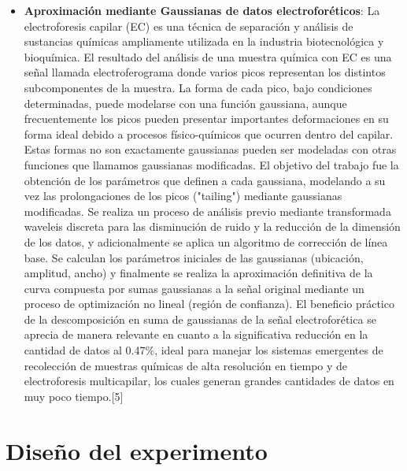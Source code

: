 \documentclass[12pt,a4paper]{article}
\begin{document}
\begin{multicols}{2}
\begin{itemize}
        \item \textbf{Aproximación mediante Gaussianas  de datos electroforéticos}: La electroforesis capilar (EC) es una técnica de separación y análisis de sustancias químicas ampliamente utilizada en la industria biotecnológica y bioquímica. El resultado del análisis de una muestra química con EC es una señal llamada electroferograma donde varios picos  representan los distintos subcomponentes de la muestra. La forma de cada pico, bajo condiciones determinadas, puede modelarse con una función gaussiana, aunque  frecuentemente los picos  pueden presentar importantes deformaciones en su forma ideal debido a procesos físico-químicos que ocurren  dentro del capilar. Estas formas  no son exactamente  gaussianas pueden ser modeladas con otras funciones que llamamos gaussianas modificadas. El objetivo del trabajo  fue la obtención  de los parámetros que definen a cada gaussiana, modelando a su vez  las prolongaciones de los picos ("tailing") mediante gaussianas modificadas. Se realiza un proceso de análisis  previo mediante transformada waveleis discreta para las disminución de ruido y la reducción de la dimensión de los datos, y adicionalmente se aplica un algoritmo de corrección de línea base. Se calculan los parámetros iniciales de las gaussianas (ubicación, amplitud, ancho) y finalmente se realiza la aproximación  definitiva de la  curva compuesta  por sumas gaussianas  a la señal original  mediante un proceso  de optimización no lineal (región de confianza). El beneficio  práctico  de la descomposición en suma de gaussianas  de la señal electroforética se aprecia de manera relevante en cuanto a la  significativa reducción en la cantidad de datos  al 0.47\%, ideal para manejar los sistemas emergentes de recolección  de muestras químicas de alta resolución en tiempo y de electroforesis multicapilar, los cuales generan grandes cantidades de  datos en muy poco tiempo.[5]
    \end{itemize}
\section{Diseño del experimento}
    

\end{multicols}
\end{document}
